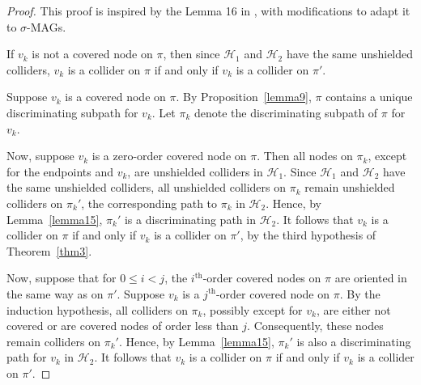 \documentclass[accepted]{uai2025} %
\begin{document}


\lemmasixteen*
\begin{proof}
This proof is inspired by the Lemma 16 in \citep{spirtes1996polynomial}, with modifications to adapt it to \( \sigma \)-MAGs.

If \( v_k \) is not a covered node on \( \pi \), then since \( \mathcal{H}_1 \) and \( \mathcal{H}_2 \) have the same unshielded colliders, \( v_k \) is a collider on \( \pi \) if and only if \( v_k \) is a collider on \( \pi' \).  

Suppose \( v_k \) is a covered node on \( \pi \). By Proposition~\ref{lemma9}, \( \pi \) contains a unique discriminating subpath for \( v_k \). Let \( \pi_k \) denote the discriminating subpath of \( \pi \) for \( v_k \).  

Now, suppose \( v_k \) is a zero-order covered node on \( \pi \). Then all nodes on \( \pi_k \), except for the endpoints and \( v_k \), are unshielded colliders in \( \mathcal{H}_1 \). Since \( \mathcal{H}_1 \) and \( \mathcal{H}_2 \) have the same unshielded colliders, all unshielded colliders on \( \pi_k \) remain unshielded colliders on \( \pi_k' \), the corresponding path to \( \pi_k \) in \( \mathcal{H}_2 \). Hence, by Lemma~\ref{lemma15}, \( \pi_k' \) is a discriminating path in \( \mathcal{H}_2 \). It follows that \( v_k \) is a collider on \( \pi \) if and only if \( v_k \) is a collider on \( \pi' \), by the third hypothesis of Theorem~\ref{thm3}.  

Now, suppose that for \( 0 \leq i < j \), the \( i^{\text{th}} \)-order covered nodes on \( \pi \) are oriented in the same way as on \( \pi' \). Suppose $v_k$ is a $j^\text{th}$-order covered node on $\pi$. By the induction hypothesis, all colliders on \( \pi_k \), possibly except for \( v_k \), are either not covered or are covered nodes of order less than \( j \). Consequently, these nodes remain colliders on \( \pi_k' \). Hence, by Lemma~\ref{lemma15}, \( \pi_k' \) is also a discriminating path for \( v_k \) in \( \mathcal{H}_2 \). It follows that \( v_k \) is a collider on \( \pi \) if and only if \( v_k \) is a collider on \( \pi' \).
\end{proof}


\end{document}
